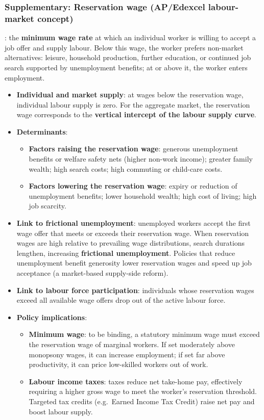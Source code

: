 \subsubsection*{Supplementary: Reservation wage (AP/Edexcel labour-market concept)}
: the \textbf{minimum wage rate} at which an individual worker is willing to accept a job offer and supply labour. Below this wage, the worker prefers non-market alternatives: leisure, household production, further education, or continued job search supported by unemployment benefits; at or above it, the worker enters employment.
\begin{itemize}
  \item \textbf{Individual and market supply}: at wages below the reservation wage, individual labour supply is zero. For the aggregate market, the reservation wage corresponds to the \textbf{vertical intercept of the labour supply curve}.
  \item \textbf{Determinants}:
  \begin{itemize}
    \item \textbf{Factors raising the reservation wage}: generous unemployment benefits or welfare safety nets (higher non-work income); greater family wealth; high search costs; high commuting or child-care costs.
    \item \textbf{Factors lowering the reservation wage}: expiry or reduction of unemployment benefits; lower household wealth; high cost of living; high job scarcity.
  \end{itemize}
  \item \textbf{Link to frictional unemployment}: unemployed workers accept the first wage offer that meets or exceeds their reservation wage. When reservation wages are high relative to prevailing wage distributions, search durations lengthen, increasing \textbf{frictional unemployment}. Policies that reduce unemployment benefit generosity lower reservation wages and speed up job acceptance (a market-based supply-side reform).
  \item \textbf{Link to labour force participation}: individuals whose reservation wages exceed all available wage offers drop out of the active labour force.
  \item \textbf{Policy implications}:
  \begin{itemize}
    \item \textbf{Minimum wage}: to be binding, a statutory minimum wage must exceed the reservation wage of marginal workers. If set moderately above monopsony wages, it can increase employment; if set far above productivity, it can price low-skilled workers out of work.
    \item \textbf{Labour income taxes}: taxes reduce net take-home pay, effectively requiring a higher gross wage to meet the worker's reservation threshold. Targeted tax credits (e.g.\ Earned Income Tax Credit) raise net pay and boost labour supply.
  \end{itemize}
\end{itemize}
